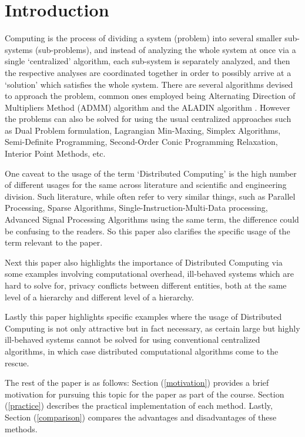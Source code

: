 \documentclass[journal]{IEEEtran}
\let\oldref\ref
\renewcommand{\ref}[1]{(\oldref{#1})}
\begin{document}
\section{Introduction}

 Computing is the process of dividing a system (problem) into several smaller sub-systems (sub-problems), and instead of analyzing the whole system at once via a single `centralized' algorithm, each sub-system is separately analyzed, and then the respective analyses are coordinated together in order to possibly arrive at a `solution' which satisfies the whole system. There are several algorithms devised to approach the problem, common ones employed being Alternating Direction of Multipliers Method (ADMM) algorithm and the ALADIN algorithm \cite{aladinAlgorithmPaper}. However the problems can also be solved for using the usual centralized approaches such as Dual Problem formulation, Lagrangian Min-Maxing, Simplex Algorithms, Semi-Definite Programming, Second-Order Conic Programming Relaxation, Interior Point Methods, etc.

One caveat to the usage of the term `Distributed Computing' is the high number of different usages for the same across literature and scientific and engineering division. Such literature, while often refer to very similar things, such as Parallel Processing, Sparse Algorithms, Single-Instruction-Multi-Data processing, Advanced Signal Processing Algorithms using the same term, the difference could be confusing to the readers. So this paper also clarifies the specific usage of the term relevant to the paper. 

Next this paper also highlights the importance of Distributed Computing via some examples involving computational overhead, ill-behaved systems which are hard to solve for, privacy conflicts between different entities, both at the same level of a hierarchy and different level of a hierarchy.

Lastly this paper highlights specific examples where the usage of Distributed Computing is not only attractive but in fact necessary, as certain large but highly ill-behaved systems cannot be solved for using conventional centralized algorithms, in which case distributed computational algorithms come to the rescue.

The rest of the paper is as follows: Section \ref{motivation} provides a brief motivation for pursuing this topic for the paper as part of the course. Section \ref{practice} describes the practical implementation of each method. Lastly, Section \ref{comparison} compares the advantages and disadvantages of these methods.
\end{document}
